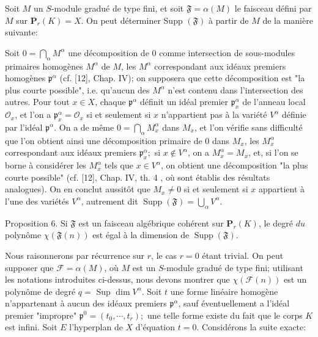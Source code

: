 Soit $M$ un $S$-module gradué de type fini, et soit $\mathfrak{F}=\alpha(M)$ le faisceau défini par $M$ sur $\mathbf{P}_{r}(K)=X$. On peut déterminer Supp $(\mathfrak{F})$ à partir de $M$ de la manière suivante:

Soit $0=\bigcap_{\alpha} M^{\alpha}$ une décomposition de 0 comme intersection de sous-modules primaires homogènes $M^{\alpha}$ de $M$, les $M^{\alpha}$ correspondant aux idéaux premiers homogènes $\mathfrak{p}^{\alpha}$ (cf. [12], Chap. IV); on supposera que cette décomposition est "la plus courte possible", i.e. qu'aucun des $M^{\alpha}$ n'est contenu dans l'intersection des autres. Pour tout $x \in X$, chaque $\mathfrak{p}^{\alpha}$ définit un idéal premier $\mathfrak{p}_{x}^{\alpha}$ de l'anneau local $\mathcal{O}_{x}$, et l'on a $\mathfrak{p}_{x}^{\alpha}=\mathcal{O}_{x}$ si et seulement si $x$ n'appartient pas à la variété $V^{\alpha}$ définie par l'idéal $\mathfrak{p}^{\alpha} .$ On a de même $0=\bigcap_{\alpha} M_{x}^{\alpha}$ dans $M_{x}$, et l'on vérifie sans difficulté que l'on obtient ainsi une décomposition primaire de 0 dans $M_{x}$, les $M_{x}^{\alpha}$ correspondant aux idéaux premiers $\mathfrak{p}_{x}^{\alpha} ;$ si $x \notin V^{\alpha}$, on a $M_{x}^{\alpha}=M_{x}$, et, si l'on se borne à considérer les $M_{x}^{\alpha}$ tels que $x \in V^{\alpha}$, on obtient une décomposition "la plus courte possible" (cf. [12], Chap. IV, th. 4 , où sont établis des résultats analogues). On en conclut aussitôt que $M_{x} \neq 0$ si et seulement si $x$ appartient à l'une des variétés $V^{\alpha}$, autrement dit $\operatorname{Supp}(\mathfrak{F})=\bigcup_{\alpha} V^{\alpha}$.

Proposition 6. Si $\mathfrak{F}$ est un faisceau algébrique cohérent sur $\mathbf{P}_{r}(K)$, le degré $d u$ polynôme $\chi(\mathfrak{F}(n))$ est égal à la dimension de $\operatorname{Supp}(\mathfrak{F})$.

Nous raisonnerons par récurrence sur $r$, le cas $r=0$ étant trivial. On peut supposer que $\mathcal{F}=\alpha(M)$, où $M$ est un $S$-module gradué de type fini; utilisant les notations introduites ci-dessus, nous devons montrer que $\chi(\mathscr{F}(n))$ est un polynôme de degré $q=$ Sup $\operatorname{dim} V^{\alpha}$. Soit $t$ une forme linéaire homogène n'appartenant à aucun des idéaux premiers $\mathfrak{p}^{\alpha}$, sauf éventuellement a l'idéal premier "impropre" $\mathfrak{p}^{0}=\left(t_{0}, \cdots, t_{r}\right) ;$ une telle forme existe du fait que le corps $K$ est infini. Soit $E$ l'hyperplan de $X$ d'équation $t=0$. Considérons la suite exacte:

